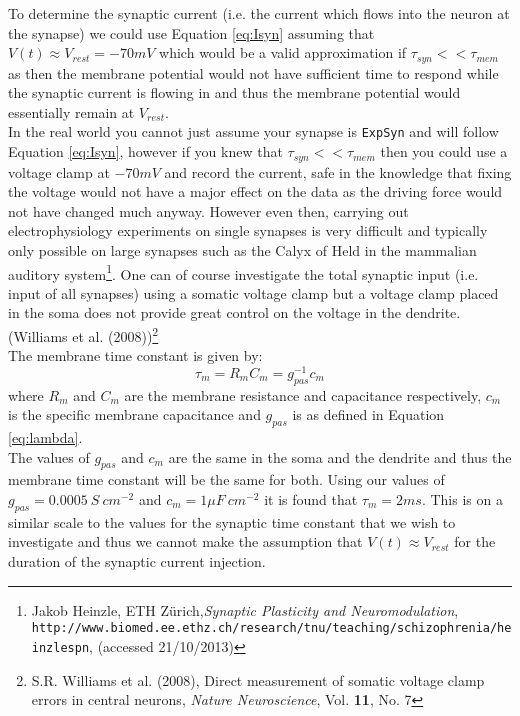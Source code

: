 \documentclass[paper=a4, fontsize=11pt]{scrartcl} %
\numberwithin{equation}{section} %
\numberwithin{figure}{section} %
\numberwithin{table}{section} %
\begin{document}
To determine the synaptic current (i.e. the current which flows into the neuron at the synapse) we could use Equation \ref{eq:Isyn} assuming that $V(t) \approx V_{rest} = -70mV$ which would be a valid approximation if $\tau_{syn} << \tau_{mem}$ as then the membrane potential would not have sufficient time to respond while the synaptic current is flowing in and thus the membrane potential would essentially remain at $V_{rest}$.\\

In the real world you cannot just assume your synapse is \texttt{ExpSyn} and will follow Equation \ref{eq:Isyn}, however if you knew that $\tau_{syn} << \tau_{mem}$ then you could use a voltage clamp at $-70mV$ and record the current, safe in the knowledge that fixing the voltage would not have a major effect on the data as the driving force would not have changed much anyway. However even then, carrying out electrophysiology experiments on single synapses is very difficult and typically only possible on large synapses such as the Calyx of Held in the mammalian auditory system\footnote{Jakob Heinzle, ETH Z\"{u}rich,\textit{Synaptic Plasticity and 
Neuromodulation},\\ \texttt{http://www.biomed.ee.ethz.ch/research/tnu/teaching/schizophrenia/heinzlespn}, (accessed 21/10/2013)}. One can of course investigate the total synaptic input (i.e. input of all synapses) using a somatic voltage clamp but a voltage clamp placed in the soma does not provide great control on the voltage in the dendrite. (Williams et al. (2008))\footnote{S.R. Williams et al. (2008), Direct measurement of somatic voltage clamp errors in central neurons, \textit{Nature Neuroscience}, Vol. \textbf{11}, No. 7}\\

The membrane time constant is given by:
\begin{equation}
\tau_m = R_m C_m = g_{pas}^{-1} c_m
\label{eq:taum}
\end{equation}
where $R_m$ and $C_m$ are the membrane resistance and capacitance respectively, $c_m$ is the specific membrane capacitance and $g_{pas}$ is as defined in Equation \ref{eq:lambda}.\\

The values of $g_{pas}$ and $c_m$ are the same in the soma and the dendrite and thus the membrane time constant will be the same for both. Using our values of $g_{pas}=0.0005~ S~cm^{-2}$ and $c_m= 1 \mu F~cm^{-2}$ it is found that $\tau_m = 2 ms$. This is on a similar scale to the values for the synaptic time constant that we wish to investigate and thus we cannot make the assumption that $V(t) \approx V_{rest}$ for the duration of the synaptic current injection.\\
\end{document}
